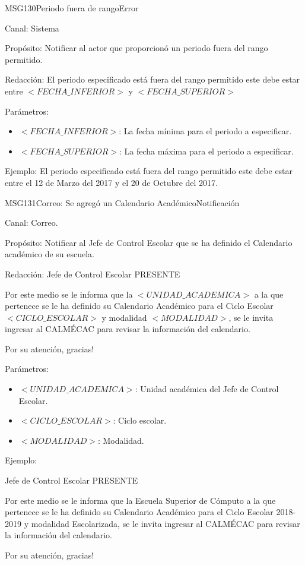 \begin{mensaje}{MSG130}{Periodo fuera de rango}{Error}
	\item[Canal:] Sistema
	\item[Propósito:] Notificar al actor que proporcionó un periodo fuera del rango permitido.
	\item[Redacción:] El periodo especificado está fuera del rango permitido este debe estar entre $<FECHA\_INFERIOR>$ y $<FECHA\_SUPERIOR>$
	\item[Parámetros:] \cdtEmpty 	
		\begin{itemize}
			\item $<FECHA\_INFERIOR>$: La fecha mínima para el periodo a especificar.
			\item $<FECHA\_SUPERIOR>$: La fecha máxima para el periodo a especificar.
		\end{itemize}
	\item[Ejemplo:] El periodo especificado está fuera del rango permitido este debe estar entre el 12 de Marzo del 2017 y el 20 de Octubre del 2017.
\end{mensaje}

\begin{mensaje}{MSG131}{Correo: Se agregó un Calendario Académico}{Notificación}
	\item[Canal:] Correo.
	\item[Propósito:] Notificar al Jefe de Control Escolar que se ha definido el Calendario académico de su escuela.
	\item[Redacción:] \cdtEmpty
	Jefe de Control Escolar
	PRESENTE
 
	Por este medio se le informa que la $<UNIDAD\_ACADEMICA>$ a la que pertenece se le ha definido su Calendario Académico para el Ciclo Escolar $<CICLO\_ESCOLAR>$ y modalidad $<MODALIDAD>$, se le invita ingresar al CALMÉCAC para revisar la información del calendario.

Por su atención, gracias!
	\item[Parámetros:] \cdtEmpty 	
		\begin{itemize}
			\item $<UNIDAD\_ACADEMICA>$: Unidad académica del Jefe de Control Escolar.
			\item $<CICLO\_ESCOLAR>$: Ciclo escolar.
			\item $<MODALIDAD>$: Modalidad.
		\end{itemize}
	\item[Ejemplo:] \cdtEmpty
	
	Jefe de Control Escolar
	PRESENTE
 
	Por este medio se le informa que la Escuela Superior de Cómputo a la que pertenece se le ha definido su Calendario Académico para el Ciclo Escolar 2018-2019 y modalidad Escolarizada, se le invita ingresar al CALMÉCAC para revisar la información del calendario.

Por su atención, gracias!

\end{mensaje}


